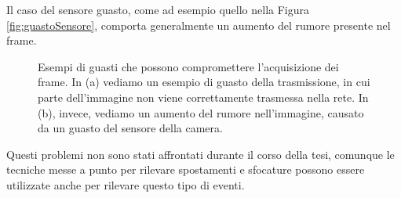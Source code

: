 Il caso del sensore guasto, come ad esempio quello nella Figura \ref{fig:guastoSensore}, comporta generalmente un aumento del rumore presente nel frame. \\
\begin{figure}[tb]
	\centering
	\caption[Esempi di guasti]{Esempi di guasti che possono compromettere l'acquisizione dei frame. In (a) vediamo un esempio di guasto della trasmissione, in cui parte dell'immagine non viene correttamente trasmessa nella rete. In (b), invece, vediamo un aumento del rumore nell'immagine, causato da un guasto del sensore della camera.}
	\label{fig:guasti}
\end{figure}
Questi problemi non sono stati affrontati durante il corso della tesi, comunque le tecniche messe a punto per rilevare spostamenti e sfocature possono essere utilizzate anche per rilevare questo tipo di eventi. 
